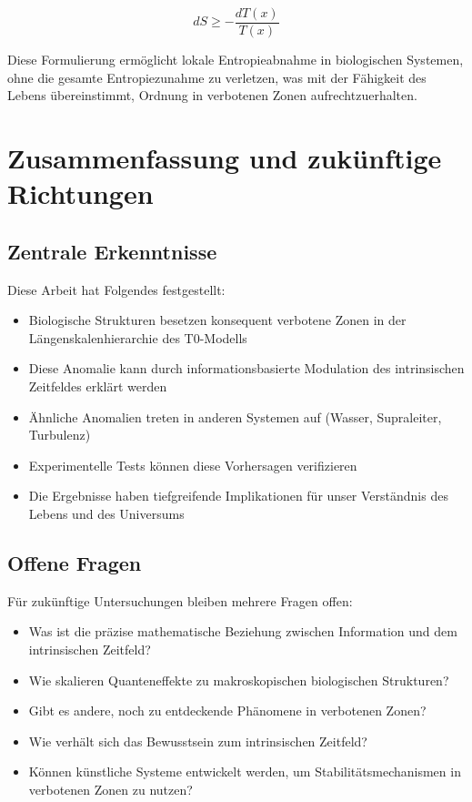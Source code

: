 \documentclass[12pt,a4paper]{article}
\newcommand{\Tfield}{T(x)}
\begin{document}
	\begin{equation}
		dS \geq -\frac{d\Tfield}{\Tfield}
	\end{equation}
	
	Diese Formulierung ermöglicht lokale Entropieabnahme in biologischen Systemen, ohne die gesamte Entropiezunahme zu verletzen, was mit der Fähigkeit des Lebens übereinstimmt, Ordnung in verbotenen Zonen aufrechtzuerhalten.
	
	\section{Zusammenfassung und zukünftige Richtungen}
	\label{sec:summary}
	
	\subsection{Zentrale Erkenntnisse}
	\label{subsec:key_findings}
	
	Diese Arbeit hat Folgendes festgestellt:
	
	\begin{itemize}
		\item Biologische Strukturen besetzen konsequent verbotene Zonen in der Längenskalenhierarchie des T0-Modells
		\item Diese Anomalie kann durch informationsbasierte Modulation des intrinsischen Zeitfeldes erklärt werden
		\item Ähnliche Anomalien treten in anderen Systemen auf (Wasser, Supraleiter, Turbulenz)
		\item Experimentelle Tests können diese Vorhersagen verifizieren
		\item Die Ergebnisse haben tiefgreifende Implikationen für unser Verständnis des Lebens und des Universums
	\end{itemize}
	
	\subsection{Offene Fragen}
	\label{subsec:open_questions}
	
	Für zukünftige Untersuchungen bleiben mehrere Fragen offen:
	
	\begin{itemize}
		\item Was ist die präzise mathematische Beziehung zwischen Information und dem intrinsischen Zeitfeld?
		\item Wie skalieren Quanteneffekte zu makroskopischen biologischen Strukturen?
		\item Gibt es andere, noch zu entdeckende Phänomene in verbotenen Zonen?
		\item Wie verhält sich das Bewusstsein zum intrinsischen Zeitfeld?
		\item Können künstliche Systeme entwickelt werden, um Stabilitätsmechanismen in verbotenen Zonen zu nutzen?
	\end{itemize}
	
\end{document}
